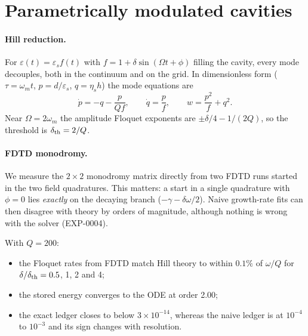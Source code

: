 \documentclass[aps,pre,reprint,superscriptaddress,amsmath,amssymb]{revtex4-2}
\begin{document}
\section{Parametrically modulated cavities}

\paragraph{Hill reduction.} For $\varepsilon(t)=\varepsilon_s f(t)$ with
$f=1+\delta\sin(\Omega t+\phi)$ filling the cavity, every mode decouples, both in
the continuum and on the grid. In dimensionless form ($\tau=\omega_mt$,
$p=d/\varepsilon_s$, $q=\eta_sh$) the mode equations are
\begin{equation}
\dot p=-q-\frac{p}{Qf},\qquad \dot q=\frac{p}{f},\qquad w=\frac{p^2}{f}+q^2 .
\end{equation}
Near $\Omega=2\omega_m$ the amplitude Floquet exponents are
$\pm\delta/4-1/(2Q)$, so the threshold is $\delta_{\rm th}=2/Q$.

\paragraph{FDTD monodromy.} We measure the $2\times2$ monodromy matrix directly from
two FDTD runs started in the two field quadratures. This matters: a start in a
single quadrature with $\phi=0$ lies \emph{exactly} on the decaying branch
($-\gamma-\delta\omega/2$). Naive growth-rate fits can then disagree with theory by
orders of magnitude, although nothing is wrong with the solver (EXP-0004).

With $Q=200$:
\begin{itemize}
\item the Floquet rates from FDTD match Hill theory to within $0.1\%$ of $\omega/Q$
  for $\delta/\delta_{\rm th}=0.5$, 1, 2 and 4;
\item the stored energy converges to the ODE at order 2.00;
\item the exact ledger closes to below $3\times10^{-14}$, whereas the naive ledger
  is at $10^{-4}$ to $10^{-3}$ and its sign changes with resolution.
\end{itemize}
\end{document}
